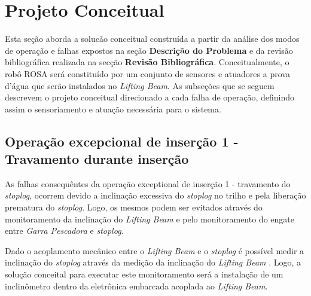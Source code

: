 



\section{Projeto Conceitual}
Esta seção aborda a solucão conceitual construída a partir da análise dos modos de operação e falhas expostos na seção {\bf Descrição do Problema} e da revisão bibliográfica realizada na secção {\bf Revisão Bibliográfica}. Conceitualmente, o robô ROSA será constituído por um conjunto de sensores e
atuadores a prova d'água que serão instalados no \emph{Lifting Beam}.
As subseções que se seguem descrevem o projeto conceitual direcionado a cada
falha de operação, definindo assim o sensoriamento e atuação necessária para o sistema. 



\subsection{Operação excepcional de inserção 1 - Travamento durante inserção}

As falhas consequêntes da operação exceptional de inserção 1 - travamento do \emph{stoplog}, ocorrem devido a inclinação excessiva do \emph{stoplog} no trilho e pela liberação prematura do \emph{stoplog}. Logo, os mesmos podem ser evitados através do monitoramento da inclinação do \emph{Lifting Beam} e pelo monitoramento do engate entre \emph{Garra Pescadora} e  \emph{stoplog}. 

Dado o acoplamento mecânico entre o \emph{Lifting Beam} e o \emph{stoplog} é possível medir a inclinação  do \emph{stoplog} através da medição da inclinação do \emph{Lifting Beam} . Logo, a solução conceital para executar este monitoramento será  a instalação de um inclinômetro dentro da eletrônica embarcada acoplada ao \emph{Lifting Beam}. 

